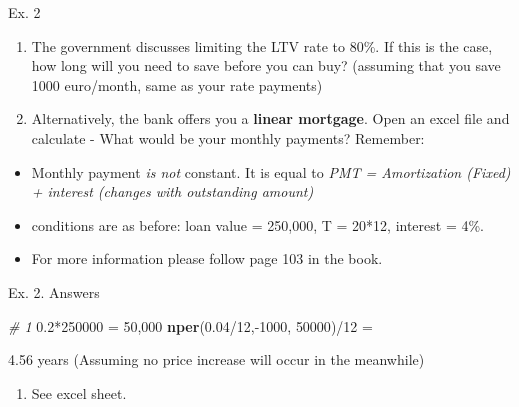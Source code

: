 \documentclass[ignorenonframetext,]{beamer}
\newenvironment{Shaded}{\begin{snugshade}}{\end{snugshade}}
\newcommand{\KeywordTok}[1]{\textcolor[rgb]{0.13,0.29,0.53}{\textbf{{#1}}}}
\newcommand{\DecValTok}[1]{\textcolor[rgb]{0.00,0.00,0.81}{{#1}}}
\newcommand{\FloatTok}[1]{\textcolor[rgb]{0.00,0.00,0.81}{{#1}}}
\newcommand{\StringTok}[1]{\textcolor[rgb]{0.31,0.60,0.02}{{#1}}}
\newcommand{\CommentTok}[1]{\textcolor[rgb]{0.56,0.35,0.01}{\textit{{#1}}}}
\newcommand{\NormalTok}[1]{{#1}}
\providecommand{\tightlist}{%
\setlength{\itemsep}{0pt}\setlength{\parskip}{0pt}}
\begin{document}
\begin{frame}{Ex. 2}

\begin{enumerate}
\def\labelenumi{\arabic{enumi}.}
\item
  The government discusses limiting the LTV rate to 80\%. If this is the
  case, how long will you need to save before you can buy? (assuming
  that you save 1000 euro/month, same as your rate payments)
\item
  Alternatively, the bank offers you a \textbf{linear mortgage}. Open an
  excel file and calculate - What would be your monthly payments?
  Remember:
\end{enumerate}

\begin{itemize}
\tightlist
\item
  Monthly payment \emph{is not} constant. It is equal to \emph{PMT =
  Amortization (Fixed) + interest (changes with outstanding amount)}
\item
  conditions are as before: loan value = 250,000, T = 20*12, interest =
  4\%.
\item
  For more information please follow page 103 in the book.
\end{itemize}

\end{frame}

\begin{frame}[fragile]{Ex. 2. Answers}

\footnotesize

\begin{Shaded}
\begin{Highlighting}[]
\CommentTok{# 1}
\FloatTok{0.2}\NormalTok{*}\DecValTok{250000} \NormalTok{=}\StringTok{ }\DecValTok{50}\NormalTok{,}\DecValTok{000}
\KeywordTok{nper}\NormalTok{(}\FloatTok{0.04}\NormalTok{/}\DecValTok{12}\NormalTok{,-}\DecValTok{1000}\NormalTok{, }\DecValTok{50000}\NormalTok{)/}\DecValTok{12} \NormalTok{=}\StringTok{ }

\FloatTok{4.56} \NormalTok{years }
\NormalTok{(Assuming no price increase will occur in the meanwhile)}
\end{Highlighting}
\end{Shaded}

\normalsize

\begin{enumerate}
\def\labelenumi{\arabic{enumi}.}
\setcounter{enumi}{1}
\tightlist
\item
  See excel sheet.
\end{enumerate}

\end{frame}
\end{document}
